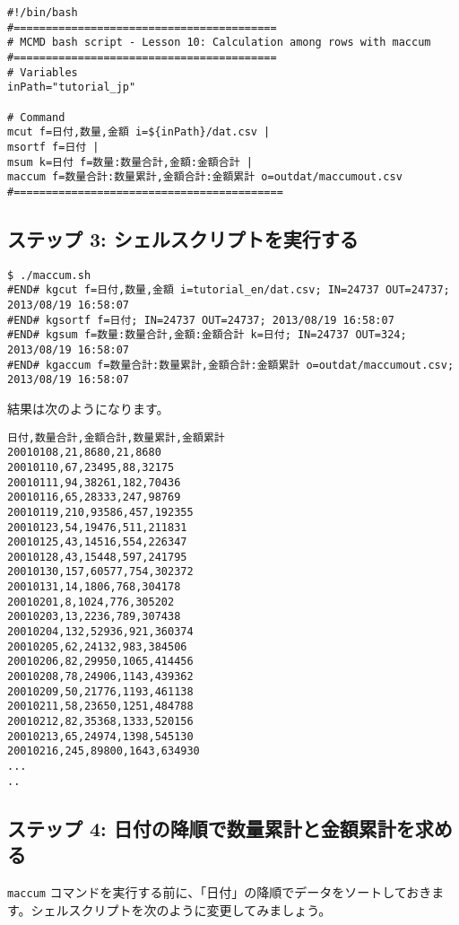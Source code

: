\begin{verbatim}
#!/bin/bash
#=========================================
# MCMD bash script - Lesson 10: Calculation among rows with maccum
#=========================================
# Variables
inPath="tutorial_jp"

# Command 
mcut f=日付,数量,金額 i=${inPath}/dat.csv |
msortf f=日付 |   
msum k=日付 f=数量:数量合計,金額:金額合計 |   
maccum f=数量合計:数量累計,金額合計:金額累計 o=outdat/maccumout.csv
#==========================================
\end{verbatim}

\subsection{ステップ 3: シェルスクリプトを実行する}

\begin{verbatim}
$ ./maccum.sh
#END# kgcut f=日付,数量,金額 i=tutorial_en/dat.csv; IN=24737 OUT=24737; 2013/08/19 16:58:07
#END# kgsortf f=日付; IN=24737 OUT=24737; 2013/08/19 16:58:07
#END# kgsum f=数量:数量合計,金額:金額合計 k=日付; IN=24737 OUT=324; 2013/08/19 16:58:07
#END# kgaccum f=数量合計:数量累計,金額合計:金額累計 o=outdat/maccumout.csv; 2013/08/19 16:58:07
\end{verbatim}

結果は次のようになります。

\begin{verbatim}
日付,数量合計,金額合計,数量累計,金額累計
20010108,21,8680,21,8680
20010110,67,23495,88,32175
20010111,94,38261,182,70436
20010116,65,28333,247,98769
20010119,210,93586,457,192355
20010123,54,19476,511,211831
20010125,43,14516,554,226347
20010128,43,15448,597,241795
20010130,157,60577,754,302372
20010131,14,1806,768,304178
20010201,8,1024,776,305202
20010203,13,2236,789,307438
20010204,132,52936,921,360374
20010205,62,24132,983,384506
20010206,82,29950,1065,414456
20010208,78,24906,1143,439362
20010209,50,21776,1193,461138
20010211,58,23650,1251,484788
20010212,82,35368,1333,520156
20010213,65,24974,1398,545130
20010216,245,89800,1643,634930
...
..
\end{verbatim}

\subsection{ステップ 4: 日付の降順で数量累計と金額累計を求める}

\verb|maccum| コマンドを実行する前に、「日付」の降順でデータをソートしておきます。シェルスクリプトを次のように変更してみましょう。

